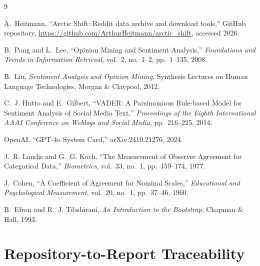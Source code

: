 \documentclass[11pt,a4paper]{article}
\begin{document}
\begin{thebibliography}{9}

A.~Heitmann,
``Arctic Shift: Reddit data archive and download tools,''
GitHub repository, \url{https://github.com/ArthurHeitmann/arctic_shift}, accessed 2026.

B.~Pang and L.~Lee,
``Opinion Mining and Sentiment Analysis,''
\textit{Foundations and Trends in Information Retrieval}, vol.~2, no.~1--2, pp.~1--135, 2008.

B.~Liu,
\textit{Sentiment Analysis and Opinion Mining},
Synthesis Lectures on Human Language Technologies, Morgan \& Claypool, 2012.

C.~J. Hutto and E.~Gilbert,
``VADER: A Parsimonious Rule-based Model for Sentiment Analysis of Social Media Text,''
\textit{Proceedings of the Eighth International AAAI Conference on Weblogs and Social Media},
pp.~216--225, 2014.

OpenAI,
``GPT-4o System Card,''
arXiv:2410.21276, 2024.

J.~R. Landis and G.~G. Koch,
``The Measurement of Observer Agreement for Categorical Data,''
\textit{Biometrics}, vol.~33, no.~1, pp.~159--174, 1977.

J.~Cohen,
``A Coefficient of Agreement for Nominal Scales,''
\textit{Educational and Psychological Measurement}, vol.~20, no.~1, pp.~37--46, 1960.

B.~Efron and R.~J. Tibshirani,
\textit{An Introduction to the Bootstrap},
Chapman \& Hall, 1993.

\end{thebibliography}

\appendix
\section{Repository-to-Report Traceability}
\end{document}
